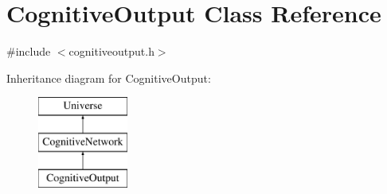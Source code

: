 \hypertarget{classCognitiveOutput}{}\section{Cognitive\+Output Class Reference}
\label{classCognitiveOutput}


{\ttfamily \#include $<$cognitiveoutput.\+h$>$}

Inheritance diagram for Cognitive\+Output\+:\begin{figure}[H]
\begin{center}
\leavevmode
\includegraphics[height=3.000000cm]{classCognitiveOutput}
\end{center}
\end{figure}
